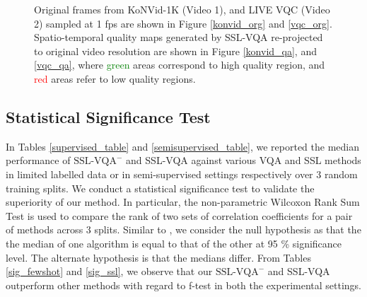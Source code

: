 \documentclass[10pt,twocolumn,letterpaper]{article}
\begin{document}
\begin{figure}
    \caption{Original frames from KoNVid-1K (Video 1), and LIVE VQC (Video 2) sampled at 1 fps are shown in Figure \ref{konvid_org} and \ref{vqc_org}. Spatio-temporal quality maps generated by SSL-VQA re-projected to original video resolution are shown in Figure \ref{konvid_qa}, and \ref{vqc_qa}, where \textcolor{green}{green} areas correspond to high quality region, and \textcolor{red}{red} areas refer to low quality regions.}
    \label{qa_maps}
\end{figure}

\subsection*{Statistical Significance Test}
In Tables \ref{supervised_table} and \ref{semisupervised_table}, we reported the median performance of $\textrm{SSL-VQA}^{-}$ and SSL-VQA against various VQA and SSL methods in limited labelled data or in semi-supervised settings respectively over 3 random training splits. We conduct a statistical significance test to validate the superiority of our method. In particular, the non-parametric Wilcoxon Rank
Sum Test is used to compare the rank of two sets of correlation coefficients for a pair of methods across 3 splits. Similar
to \cite{twostepQA}, we consider the null hypothesis as that
the the median of one algorithm is equal to that of the other
at 95 \% significance level. The alternate hypothesis is that
the medians differ. From Tables \ref{sig_fewshot} and \ref{sig_ssl}, we observe that our $\textrm{SSL-VQA}^{-}$ and SSL-VQA outperform other methods with regard to f-test in both the experimental settings.
\end{document}

